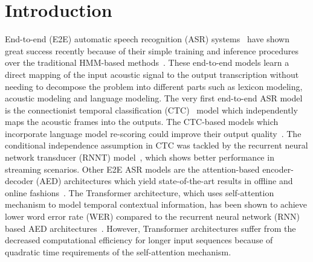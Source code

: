 \documentclass{article}
\begin{document}
\section{Introduction}

End-to-end (E2E) automatic speech recognition (ASR) systems~\citep{graves2006connectionist,amodei2016deep,chan2016listen,karita2019asru} have shown great success recently because of their simple training and inference procedures over the traditional HMM-based methods~\citep{povey}.  These end-to-end models learn a direct mapping of the input acoustic signal to the output transcription without needing to decompose the problem into different parts such as lexicon modeling, acoustic modeling and language modeling. The very first end-to-end ASR model is the connectionist temporal classification (CTC)~\citep{graves2006connectionist} model which independently maps the acoustic frames into the outputs. The CTC-based models which incorporate language model re-scoring could improve their output quality~\citep{graves2014towards}.
The conditional independence assumption in CTC was tackled by the recurrent neural network transducer (RNNT) model~\citep{graves2012sequence,He2018}, which shows better performance in streaming scenarios. Other E2E ASR models are the attention-based encoder-decoder (AED) architectures which yield state-of-the-art results in offline and online fashions~\citep{karita2019is, karita2019asru, chan2016listen, moritz2020, wang2020a,wang2020c, sony}. The Transformer architecture, which uses self-attention mechanism to model temporal contextual information, has been shown to achieve lower word error rate (WER) compared to the recurrent neural network (RNN) based AED architectures~\citep{karita2019asru}. 
However, Transformer architectures suffer from the decreased computational efficiency for longer input sequences because of quadratic time requirements of the self-attention mechanism. 
\end{document}
